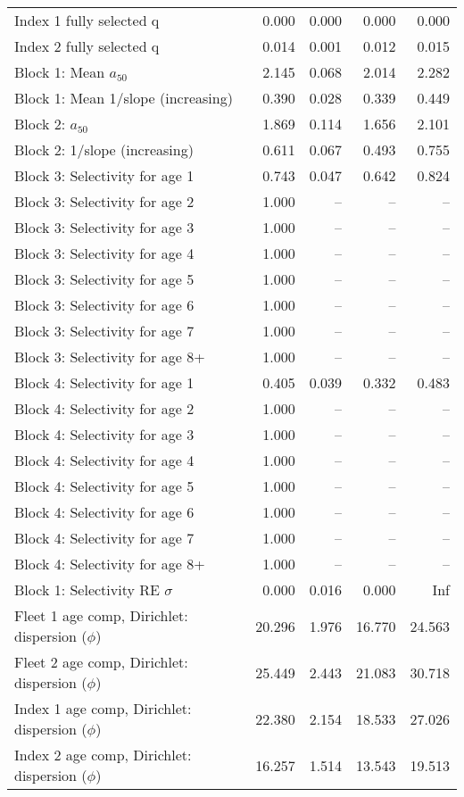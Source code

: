 \documentclass[
]{article}
\begin{document}
\begin{landscape}
\begin{longtable}[t]{lrrrr}
\endfoot
\bottomrule
\endlastfoot
Index 1 fully selected q & 0.000 & 0.000 & 0.000 & 0.000\\
Index 2 fully selected q & 0.014 & 0.001 & 0.012 & 0.015\\
Block 1: Mean $a_{50}$ & 2.145 & 0.068 & 2.014 & 2.282\\
Block 1: Mean 1/slope (increasing) & 0.390 & 0.028 & 0.339 & 0.449\\
Block 2: $a_{50}$ & 1.869 & 0.114 & 1.656 & 2.101\\
\addlinespace
Block 2: 1/slope (increasing) & 0.611 & 0.067 & 0.493 & 0.755\\
Block 3: Selectivity for age 1 & 0.743 & 0.047 & 0.642 & 0.824\\
Block 3: Selectivity for age 2 & 1.000 & -- & -- & --\\
Block 3: Selectivity for age 3 & 1.000 & -- & -- & --\\
Block 3: Selectivity for age 4 & 1.000 & -- & -- & --\\
\addlinespace
Block 3: Selectivity for age 5 & 1.000 & -- & -- & --\\
Block 3: Selectivity for age 6 & 1.000 & -- & -- & --\\
Block 3: Selectivity for age 7 & 1.000 & -- & -- & --\\
Block 3: Selectivity for age 8+ & 1.000 & -- & -- & --\\
Block 4: Selectivity for age 1 & 0.405 & 0.039 & 0.332 & 0.483\\
\addlinespace
Block 4: Selectivity for age 2 & 1.000 & -- & -- & --\\
Block 4: Selectivity for age 3 & 1.000 & -- & -- & --\\
Block 4: Selectivity for age 4 & 1.000 & -- & -- & --\\
Block 4: Selectivity for age 5 & 1.000 & -- & -- & --\\
Block 4: Selectivity for age 6 & 1.000 & -- & -- & --\\
\addlinespace
Block 4: Selectivity for age 7 & 1.000 & -- & -- & --\\
Block 4: Selectivity for age 8+ & 1.000 & -- & -- & --\\
Block 1: Selectivity RE $\sigma$ & 0.000 & 0.016 & 0.000 & Inf\\
Fleet 1 age comp, Dirichlet: dispersion ($\phi$) & 20.296 & 1.976 & 16.770 & 24.563\\
Fleet 2 age comp, Dirichlet: dispersion ($\phi$) & 25.449 & 2.443 & 21.083 & 30.718\\
\addlinespace
Index 1 age comp, Dirichlet: dispersion ($\phi$) & 22.380 & 2.154 & 18.533 & 27.026\\
Index 2 age comp, Dirichlet: dispersion ($\phi$) & 16.257 & 1.514 & 13.543 & 19.513\\*
\end{longtable}
\end{landscape}
\end{document}
